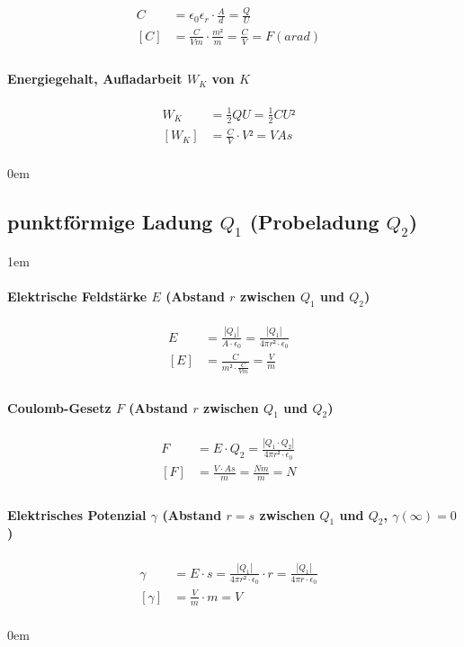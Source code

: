 \begin{align*}
  C &= \epsilon_0 \epsilon_r \cdot \frac{A}{d} = \frac{Q}{U} &\\
  [C] &= \frac{C}{Vm} \cdot \frac{m²}{m} = \frac{C}{V} = F(arad) &\\
\end{align*}

\paragraph{Energiegehalt, Aufladarbeit $W_K$ von $K$}

\begin{align*}
  W_{K} &= \frac{1}{2}QU = \frac{1}{2}CU² &\\
  [W_{K}] &= \frac{C}{V} \cdot V² = VAs &\\
\end{align*}

\leftskip0em

\subsection{punktförmige Ladung $Q_1$ (Probeladung $Q_2$)}

\leftskip1em
\paragraph{Elektrische Feldstärke $E$ (Abstand $r$ zwischen $Q_1$ und $Q_2$)}

\begin{align*}
  E &= \frac{\left|Q_1\right|}{A \cdot \epsilon_0} = \frac{\left|Q_1\right|}{4 \pi r² \cdot
  \epsilon_0} &\\
  [E] &= \frac{C}{m² \cdot \frac{C}{Vm}} = \frac{V}{m} &\\
\end{align*}

\paragraph{Coulomb-Gesetz $F$ (Abstand $r$ zwischen $Q_1$ und $Q_2$)}
\begin{align*}
  F &= E \cdot Q_2 = \frac{\left| Q_1 \cdot Q_2 \right|}{4 \pi r² \cdot \epsilon_0} &\\
  [F] &= \frac{V \cdot As}{m} = \frac{Nm}{m} = N &\\
\end{align*}

\paragraph{Elektrisches Potenzial $\gamma$ (Abstand $r = s$ zwischen $Q_1$ und $Q_2$, $
\gamma(\infty) = 0$)}

\begin{align*}
  \gamma &= E \cdot s = \frac{\left|Q_1\right|}{4 \pi r² \cdot \epsilon_0} \cdot r =
  \frac{\left|Q_1\right|}{4 \pi r \cdot \epsilon_0} &\\
  [\gamma] &= \frac{V}{m} \cdot m = V &\\
\end{align*}

\leftskip0em

